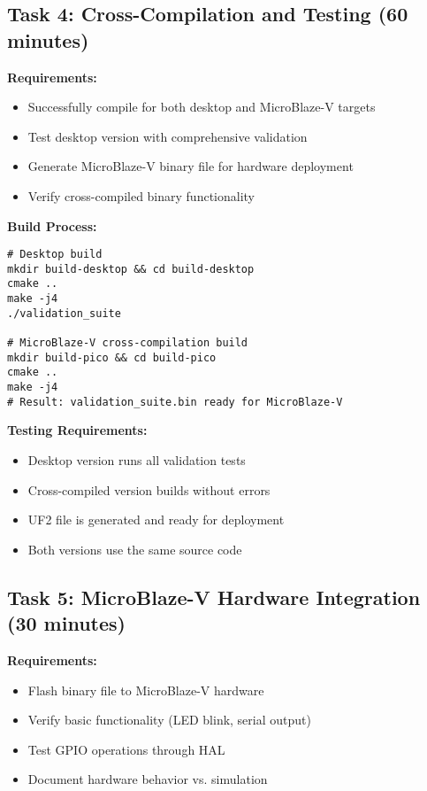 \documentclass[11pt,a4paper]{article}
\begin{document}
\subsection{Task 4: Cross-Compilation and Testing (60 minutes)}

\textbf{Requirements:}
\begin{itemize}
    \item Successfully compile for both desktop and MicroBlaze-V targets
    \item Test desktop version with comprehensive validation
    \item Generate MicroBlaze-V binary file for hardware deployment
    \item Verify cross-compiled binary functionality
\end{itemize}

\textbf{Build Process:}
\begin{verbatim}
# Desktop build
mkdir build-desktop && cd build-desktop
cmake ..
make -j4
./validation_suite

# MicroBlaze-V cross-compilation build
mkdir build-pico && cd build-pico
cmake ..
make -j4
# Result: validation_suite.bin ready for MicroBlaze-V
\end{verbatim}

\textbf{Testing Requirements:}
\begin{itemize}
    \item Desktop version runs all validation tests
    \item Cross-compiled version builds without errors
    \item UF2 file is generated and ready for deployment
    \item Both versions use the same source code
\end{itemize}

\subsection{Task 5: MicroBlaze-V Hardware Integration (30 minutes)}

\textbf{Requirements:}
\begin{itemize}
    \item Flash binary file to MicroBlaze-V hardware
    \item Verify basic functionality (LED blink, serial output)
    \item Test GPIO operations through HAL
    \item Document hardware behavior vs. simulation
\end{itemize}
\end{document}
